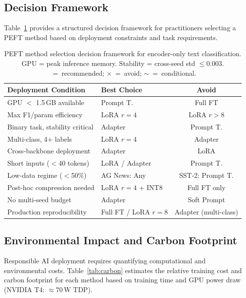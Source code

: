 \documentclass[conference]{IEEEtran}
\begin{document}
\subsection{Decision Framework}

Table~\ref{tab:decision} provides a structured decision framework for practitioners selecting a PEFT method based on deployment constraints and task requirements.

\begin{table}[ht]
\centering
\caption{PEFT method selection decision framework for encoder-only text classification. GPU = peak inference memory. Stability = cross-seed std ${\leq}0.003$. \checkmark~=~recommended; $\times$~=~avoid; $\sim$~=~conditional.}
\label{tab:decision}
\renewcommand{\arraystretch}{1.3}
\setlength{\tabcolsep}{3pt}
\begin{tabular}{p{2.8cm}p{1.5cm}c}
\toprule
\textbf{Deployment Condition} & \textbf{Best Choice} & \textbf{Avoid}\\
\midrule
GPU $<$ 1.5\,GB available & Prompt T. & Full FT\\
Max F1/param efficiency & LoRA $r{=}4$ & LoRA $r{>}8$\\
Binary task, stability critical & Adapter & Prompt T.\\
Multi-class, 4+ labels & LoRA $r{=}4$ & Adapter\\
Cross-backbone deployment & Adapter & LoRA\\
Short inputs ($<$40 tokens) & LoRA / Adapter & Prompt T.\\
Low-data regime ($<$50\%) & AG News: Any & SST-2: Prompt T.\\
Post-hoc compression needed & LoRA $r{=}4$ + INT8 & Full FT only\\
No multi-seed budget & Adapter & Soft Prompt\\
Production reproducibility & Full FT / LoRA $r{=}8$ & Adapter (multi-class)\\
\bottomrule
\end{tabular}
\end{table}

\subsection{Environmental Impact and Carbon Footprint}

Responsible AI deployment requires quantifying computational and environmental costs. Table~\ref{tab:carbon} estimates the relative training cost and carbon footprint for each method based on training time and GPU power draw (NVIDIA T4: ${\approx}70$\,W TDP).
\end{document}
